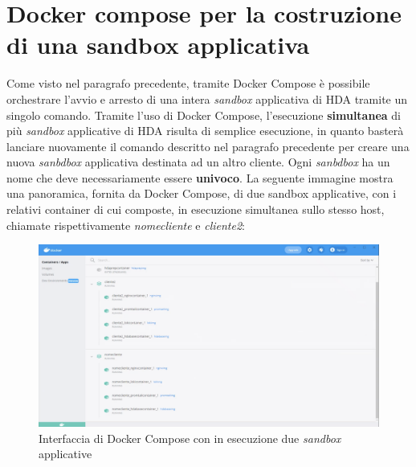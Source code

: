 \section{Docker compose per la costruzione di una sandbox applicativa}
Come visto nel paragrafo precedente, tramite Docker Compose è possibile orchestrare l'avvio e arresto di una intera \textit{sandbox} applicativa di HDA tramite un singolo comando. Tramite l'uso di Docker Compose, l'esecuzione \textbf{simultanea} di più \textit{sandbox} applicative di HDA risulta di semplice esecuzione, in quanto basterà lanciare nuovamente il comando descritto nel paragrafo precedente per creare una nuova \textit{sanbdbox} applicativa destinata ad un altro cliente. Ogni \textit{sanbdbox} ha un nome che deve necessariamente essere \textbf{univoco}.
La seguente immagine mostra una panoramica, fornita da Docker Compose, di due sandbox applicative, con i relativi container di cui composte, in esecuzione simultanea sullo stesso host, chiamate rispettivamente \textit{nomecliente} e \textit{cliente2}:
\begin{figure}[!h]     
\centering 
    \includegraphics[width=1.0\columnwidth]{immagini/screenshot/docker_compose_sandbox} 
    \caption{Interfaccia di Docker Compose con in esecuzione due \textit{sandbox} applicative}
\end{figure} \\


